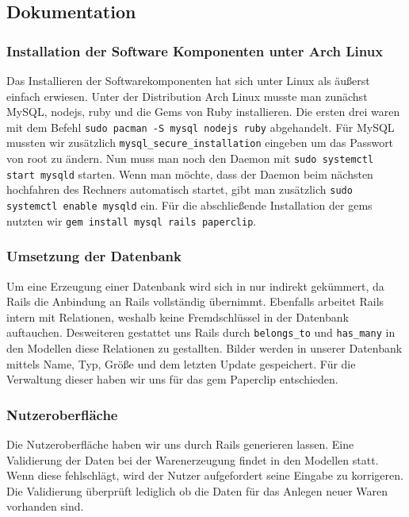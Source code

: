 \documentclass[pdftex,10pt,a4paper]{article}
\begin{document}
\subsection{Dokumentation}

\subsubsection{Installation der Software Komponenten unter Arch Linux}
Das Installieren der Softwarekomponenten hat sich unter Linux als \"au{\ss}erst einfach erwiesen. Unter der Distribution Arch Linux musste man zun\"achst MySQL, nodejs, ruby und die Gems von Ruby installieren. Die ersten drei waren mit dem Befehl \texttt{sudo pacman -S mysql nodejs ruby} abgehandelt. F\"ur MySQL mussten wir  zus\"atzlich \texttt{mysql\_secure\_installation} eingeben um das Passwort von root zu \"andern. Nun muss man noch den Daemon mit \texttt{sudo systemctl start mysqld} starten. Wenn man m\"ochte, dass der Daemon beim n\"achsten hochfahren des Rechners automatisch startet, gibt man zus\"atzlich \texttt{sudo systemctl enable mysqld} ein. F\"ur die abschlie{\ss}ende Installation der gems nutzten wir \texttt{gem install mysql rails paperclip}. 

\subsubsection{Umsetzung der Datenbank}
Um eine Erzeugung einer Datenbank wird sich in nur indirekt gek\"ummert, da Rails die Anbindung an Rails vollst\"andig \"ubernimmt. Ebenfalls arbeitet Rails intern mit Relationen, weshalb keine Fremdschl\"ussel in der Datenbank auftauchen. Desweiteren gestattet uns Rails durch \texttt{belongs\_to} und \texttt{has\_many} in den Modellen diese Relationen zu gestallten. Bilder werden in unserer Datenbank mittels Name, Typ, Gr\"o{\ss}e und dem letzten Update gespeichert. F\"ur die Verwaltung dieser haben wir uns f\"ur das gem Paperclip entschieden. 

\subsubsection{Nutzeroberfl\"ache}
Die Nutzeroberfl\"ache haben wir uns durch Rails generieren lassen. Eine Validierung der Daten bei der Warenerzeugung findet in den Modellen statt. Wenn diese fehlschl\"agt, wird der Nutzer aufgefordert seine Eingabe zu korrigeren. Die Validierung \"uberpr\"uft lediglich ob die Daten f\"ur das Anlegen neuer Waren vorhanden sind.  



\end{document}
